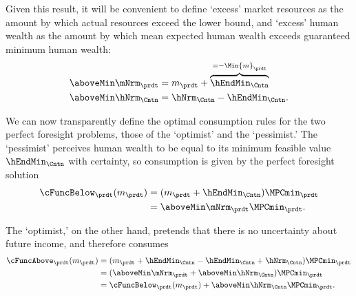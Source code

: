   Given this result, it will be convenient to define `excess' market
  resources as the amount by which actual resources exceed the lower
  bound, and `excess' human wealth as the amount by which mean expected human wealth
  exceeds guaranteed minimum human wealth:
  \begin{equation*}\begin{gathered}\begin{aligned}
        \aboveMin \mNrm_{\prdt}  & = m_{\prdt}+\overbrace{\hEndMin_{\Cntn}}^{=-\Min{m}_{\prdt}}
        \\  \aboveMin \hNrm_{\Cntn}  & = \hNrm_{\Cntn}-\hEndMin_{\Cntn}.
      \end{aligned}\end{gathered}\end{equation*}

  We can now transparently define the optimal
  consumption rules for the two perfect foresight problems, those of the
  `optimist' and the `pessimist.'  The `pessimist' perceives human
  wealth to be equal to its minimum feasible value $\hEndMin_{\Cntn}$ with certainty, so
  consumption is given by the perfect foresight solution
  \begin{equation*}\begin{gathered}\begin{aligned}
        \cFuncBelow_{\prdt}(m_{\prdt})  & = (m_{\prdt}+\hEndMin_{\Cntn})\MPCmin_{\prdt}
        \\  & = \aboveMin \mNrm_{\prdt}\MPCmin_{\prdt}
        .
      \end{aligned}\end{gathered}\end{equation*}

  The `optimist,' on the other hand, pretends that there is no uncertainty
  about future income, and therefore consumes
  \begin{equation*}\begin{gathered}\begin{aligned}
        \cFuncAbove_{\prdt}(m_{\prdt})  & = (m_{\prdt} +\hEndMin_{\Cntn} - \hEndMin_{\Cntn} + \hNrm_{\Cntn} )\MPCmin_{\prdt}
        \\    & = (\aboveMin \mNrm_{\prdt} + \aboveMin \hNrm_{\Cntn})\MPCmin_{\prdt}
        \\      & = \cFuncBelow_{\prdt}(m_{\prdt})+\aboveMin \hNrm_{\Cntn} \MPCmin_{\prdt}
        .
      \end{aligned}\end{gathered}\end{equation*}

